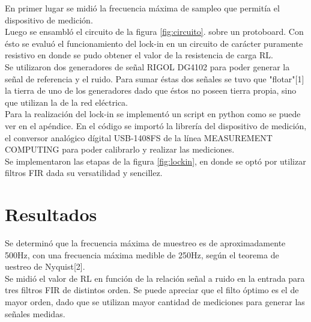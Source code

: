 \documentclass[11pt,a4paper]{extarticle}
\begin{document}
\begin{multicols}{2}
En primer lugar se midió la frecuencia máxima de 
sampleo que permitía el dispositivo de medición.\\

Luego se ensambló el circuito de la figura \ref{fig:circuito}. sobre 
un protoboard. Con ésto se evaluó el funcionamiento del
lock-in en un circuito de carácter puramente resistivo 
en donde se pudo obtener el valor de la resistencia 
de carga RL.\\ 

Se utilizaron dos generadores de señal RIGOL DG4102 
para poder generar la señal de referencia y el ruido.
Para sumar éstas dos señales se tuvo que "flotar"[1] la 
tierra de uno de los generadores dado que éstos no poseen 
tierra propia, sino que utilizan la de la red eléctrica.\\

Para la realización del lock-in se implementó un 
script en python como se puede ver en el apéndice.
En el código se importó la librería del dispositivo 
de medición, el 
conversor analógico dígital USB-1408FS de la línea 
MEASUREMENT COMPUTING para poder 
calibrarlo y realizar las mediciones.\\

Se implementaron 
las etapas de la figura \ref{fig:lockin}, en donde 
se optó por utilizar filtros FIR dada su versatilidad 
y sencillez.

\section{Resultados}

Se determinó que la frecuencia máxima de muestreo es 
de aproximadamente 
500Hz, con una frecuencia máxima medible de 250Hz, 
según el teorema de uestreo de Nyquist[2].\\

Se midió el valor de RL en función 
de la relación señal a ruido en la entrada para tres 
filtros FIR de distintos orden.
Se puede apreciar que el filto óptimo es el de mayor 
orden, dado que se utilizan mayor cantidad de 
mediciones para generar las señales medidas.


\end{multicols}
\end{document}
